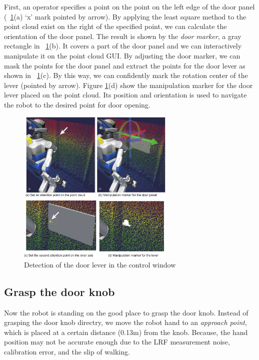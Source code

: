 First, an operator specifies a point on the point on the left edge of the door panel (\figurename~\ref{fig:door_manip_markers}(a) `x' mark pointed by arrow). By applying the least square method to the point cloud exist on the right of the specified point, we can calculate the orientation of the door panel.
The result is shown by the {\it door marker}, a gray rectangle in \figurename~\ref{fig:door_manip_markers}(b).
It covers a part of the door panel and we can interactively manipulate it on the 
point cloud GUI. By adjusting the door marker, we can mask the points for the door panel and extract the points for the door lever as shown in \figurename~\ref{fig:door_manip_markers}(c).
By this way, we can confidently mark the rotation center of the lever (pointed by arrow).
Figure \ref{fig:door_manip_markers}(d) show the manipulation marker for the door lever placed on the point cloud. Its position and orientation is used to navigate the robot to the desired point for door opening.

\begin{figure}[t]
  \centering
  \includegraphics[width = 7.5cm]{img/door_manipulation_markers}
  \caption{Detection of the door lever in the control window}
  \label{fig:door_manip_markers}
\end{figure}
		

\subsection{Grasp the door knob}
%
Now the robot is standing on the good place to grasp the door knob.
Instead of grasping the door knob directry, we move the robot hand to an {\it approach point},
which is placed at a certain distance (0.13m) from the knob. 
Because, the hand position may not be accurate enough due to the LRF measurement noise, calibration error,
and the slip of walking.


